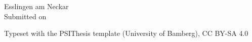 \begin{titlepage}
\begin{center}
\vfill

{\large Esslingen am Neckar}\\[0.35cm]
{\large Submitted on \submissiondate}

\vspace{0.9cm}

{\footnotesize Typeset with the PSIThesis template (University of Bamberg), CC BY-SA 4.0}

\vspace{0.4\baselineskip}

\end{center}

\restoregeometry

\end{titlepage}
